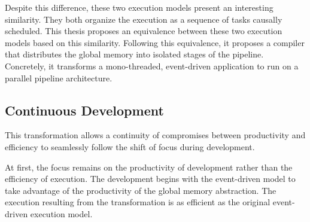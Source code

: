Despite this difference, these two execution models present an interesting similarity.
They both organize the execution as a sequence of tasks causally scheduled. %
This thesis proposes an equivalence between these two execution models based on this similarity.
Following this equivalence, it proposes a compiler that distributes the global memory into isolated stages of the pipeline.
Concretely, it transforms a mono-threaded, event-driven application to run on a parallel pipeline architecture.

\subsection{Continuous Development}

This transformation allows a continuity of compromises between productivity and efficiency to seamlessly follow the shift of focus during development.






At first, the focus remains on the productivity of development rather than the efficiency of execution.
The development begins with the event-driven model to take advantage of the productivity of the global memory abstraction.
The execution resulting from the transformation is as efficient as the original event-driven execution model.


